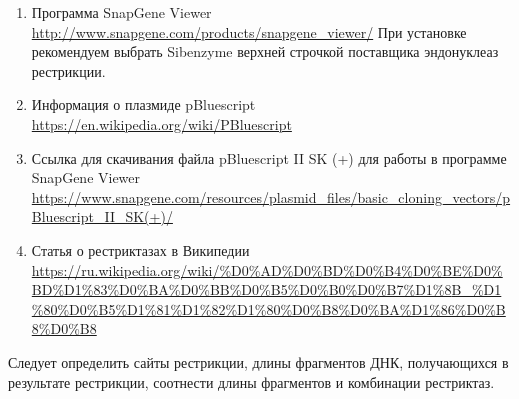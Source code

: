 \begin{enumerate}
    \item Программа SnapGene Viewer \url{http://www.snapgene.com/products/snapgene_viewer/} При установке рекомендуем выбрать Sibenzyme верхней строчкой поставщика эндонуклеаз рестрикции. 
    \item Информация о плазмиде pBluescript\\ \url{https://en.wikipedia.org/wiki/PBluescript}
    \item Ссылка для скачивания файла pBluescript II SK (+) для работы в программе SnapGene Viewer \url{https://www.snapgene.com/resources/plasmid_files/basic_cloning_vectors/pBluescript_II_SK(+)/}
    \item Статья о рестриктазах в Википедии \url{https://ru.wikipedia.org/wiki/%D0%AD%D0%BD%D0%B4%D0%BE%D0%BD%D1%83%D0%BA%D0%BB%D0%B5%D0%B0%D0%B7%D1%8}\linebreak \url{B_%D1%80%D0%B5%D1%81%D1%82%D1%80%D0%B8%D0%BA%D1%86%D0%B8%D0%B8}
\end{enumerate}

\explanationSection

Следует определить сайты рестрикции, длины фрагментов ДНК, получающихся в результате рестрикции, соотнести длины фрагментов и комбинации рестриктаз.

